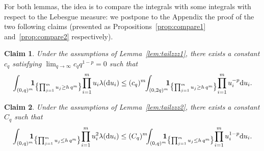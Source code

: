 \documentclass[10pt]{amsart}
\newtheorem{claim}{Claim}
\theoremstyle{definition}
\newcommand{\dd}{\mathrm{d}}
\newcommand{\ind}{\mathbf{1}}
\begin{document}
For both lemmas, the idea is to compare the integrals with some integrals with respect to the Lebesgue measure: we postpone to the Appendix the proof of the two following claims (presented as Propositions~\ref{prop:compare1} and~\ref{prop:compare2} respectively).

\begin{claim}
Under the assumptions of Lemma~\ref{lem:tailzzz1},
there exists a constant $c_q$ satisfying
$\lim_{q\to\infty} c_q q^{1-p} =0$ such that
\begin{equation}
\label{plusdidee}
\int_{(0,q)^m}\hspace*{-2mm} \ind_{\bigl\{\prod^m_{j=1}u_j \geq h\, q^m\bigr\}}\! \prod_{i=1}^m u_i \lambda(\dd u_i) \le (c_q)^m\hspace*{-1mm}\int_{(0,2q)^m}\hspace*{-2mm} \ind_{\bigl\{\prod^m_{j=1}u_j \ge h\, q^m\bigr\}}\! \prod_{i=1}^m u_i^{-p} \dd u_i.
\end{equation}
\end{claim}

\begin{claim}
Under the assumptions of Lemma~\ref{lem:tailzzz2},
there exists a constant $C_q$ such that
\begin{equation}
\label{plusdidee2}
\int_{(0,q)^m} \hspace*{-2.5mm}\ind_{\bigl\{\prod^m_{j=1}u_j \le h\, q^m\bigr\}}\! \prod_{i=1}^m u_i^2 \lambda(\dd u_i) \le (C_q)^m\hspace*{-1.5mm}
\int_{(0,q)^m} \hspace*{-2.5mm}\ind_{\bigl\{\prod^m_{j=1} u_j \le h\, q^m\bigr\}}\! \prod_{i=1}^m u_i^{1-p} \dd u_i.
\end{equation}
\end{claim}
\end{document}
